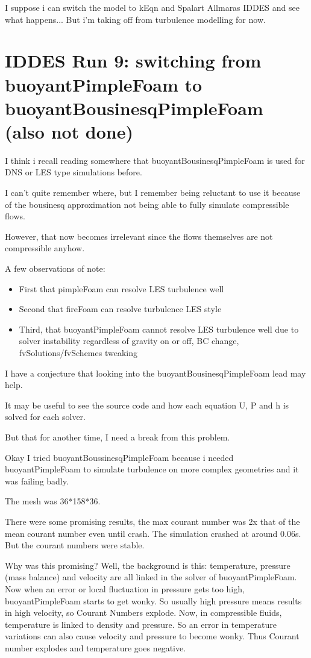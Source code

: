 \documentclass[12pt]{article}
\renewcommand{\_}{\kern-1.5pt\textunderscore\kern-1.5pt}
\begin{document}
I suppose i can switch the model to kEqn and Spalart Allmaras IDDES and see what happens... But i'm taking off from turbulence modelling for now. 

\section{IDDES Run 9: switching from buoyantPimpleFoam to buoyantBousinesqPimpleFoam (also not done)}


I think i recall reading somewhere that buoyantBousinesqPimpleFoam is used for DNS or LES type simulations before. 


I can't quite remember where, but I remember being reluctant to use it because of the bousinesq approximation not being able to fully simulate compressible flows.


However, that now becomes irrelevant since the flows themselves are not compressible anyhow.


A few observations of note:


\begin{itemize}
	\item First that pimpleFoam can resolve LES turbulence well
	\item Second that fireFoam can resolve turbulence LES style
	\item Third, that buoyantPimpleFoam cannot resolve LES turbulence well due to solver instability regardless of gravity on or off, BC change, fvSolutions/fvSchemes tweaking
	
\end{itemize}


I have a conjecture that looking into the buoyantBousinesqPimpleFoam lead may help.


It may be useful to see the source code and how each equation U, P and h is solved for each solver.


But that for another time, I need a break from this problem. 

Okay I tried buoyantBoussinesqPimpleFoam because i needed buoyantPimpleFoam to simulate turbulence on more complex geometries and it was failing badly. 

The mesh was 36*158*36. 

There were some promising results, the max courant number was 2x that of the mean courant number even until crash. The simulation crashed at around 0.06s. But the courant numbers were stable. 


Why was this promising? Well, the background is this: temperature, pressure (mass balance) and velocity are all linked in the solver of buoyantPimpleFoam. Now when an error or local fluctuation in pressure gets too high, buoyantPimpleFoam starts to get wonky. So usually high pressure means results in high velocity, so Courant Numbers explode. Now, in compressible fluids, temperature is linked to density and pressure. So an error in temperature variations can also cause velocity and pressure to become wonky. Thus Courant number explodes and temperature goes negative. 
\end{document}
